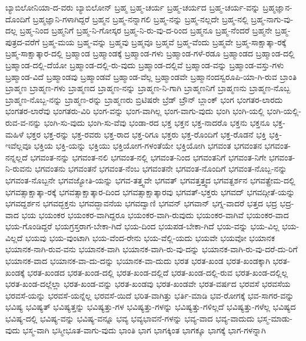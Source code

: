 {ಬ್ಯಾಬಿಲೋನಿಯಾ-ದ-ವರು
ಬ್ಯಾಬಿಲೋನ್
ಬ್ರಹ್ಮ
ಬ್ರಹ್ಮ-ಚರ್ಯ
ಬ್ರಹ್ಮ-ಚರ್ಯದ
ಬ್ರಹ್ಮ-ಚರ್ಯ-ವನ್ನು
ಬ್ರಹ್ಮಜ್ಞಾನ-ದೊಂದಿಗೆ
ಬ್ರಹ್ಮಜ್ಞಾನಿ-ಗಳಾಗಿದ್ದರೆ
ಬ್ರಹ್ಮನ
ಬ್ರಹ್ಮ-ನನ್ನಾಗಲಿ
ಬ್ರಹ್ಮ-ನನ್ನು
ಬ್ರಹ್ಮ-ನಲ್ಲದೇ
ಬ್ರಹ್ಮ-ನಲ್ಲಿ
ಬ್ರಹ್ಮ-ನಾಗು-ವು-ದಲ್ಲ
ಬ್ರಹ್ಮ-ನಿಂದ
ಬ್ರಹ್ಮನಿಗೆ
ಬ್ರಹ್ಮ-ನಿ-ಗೋಸ್ಕರ
ಬ್ರಹ್ಮ-ನಿ-ರು-ವು-ದ-ರಿಂದ
ಬ್ರಹ್ಮನೂ
ಬ್ರಹ್ಮ-ನೆಂದರೆ
ಬ್ರಹ್ಮನೇ
ಬ್ರಹ್ಮ-ಪುತ್ರದ-ವರೆಗೆ
ಬ್ರಹ್ಮ-ಮಯ
ಬ್ರಹ್ಮ-ವನ್ನು
ಬ್ರಹ್ಮವು
ಬ್ರಹ್ಮವೂ
ಬ್ರಹ್ಮವೆ
ಬ್ರಹ್ಮ-ವೆಂದು
ಬ್ರಹ್ಮವೇ
ಬ್ರಹ್ಮ-ಸಾಕ್ಷಾತ್ಕಾ-ರಕ್ಕೆ
ಬ್ರಹ್ಮ-ಸಾಕ್ಷಾತ್ಕಾರ-ದಲ್ಲಿ
ಬ್ರಹ್ಮಾಂಡ
ಬ್ರಹ್ಮಾಂಡಕ್ಕೆ
ಬ್ರಹ್ಮಾಂಡ-ಗಳು
ಬ್ರಹ್ಮಾಂಡ-ಗಳೆ-ರಡೂ
ಬ್ರಹ್ಮಾಂಡದ
ಬ್ರಹ್ಮಾಂಡ-ದಲ್ಲಿ
ಬ್ರಹ್ಮಾಂಡ-ದಲ್ಲಿ-ದೆಯೋ
ಬ್ರಹ್ಮಾಂಡ-ದಲ್ಲಿ-ರು-ವುದು
ಬ್ರಹ್ಮಾಂಡ-ದಲ್ಲಿವೆ
ಬ್ರಹ್ಮಾಂಡ-ವನ್ನು
ಬ್ರಹ್ಮಾಂಡ-ವಸ್ತು-ಗಳು
ಬ್ರಹ್ಮಾಂಡ-ವಿದೆ
ಬ್ರಹ್ಮಾಂಡವು
ಬ್ರಹ್ಮಾಂಡವೆ
ಬ್ರಹ್ಮಾಂಡ-ವೆಲ್ಲ
ಬ್ರಹ್ಮಾಂಡವೇ
ಬ್ರಹ್ಮಾನಂದಸ್ವರೂಪಿ-ಯಾ-ಗಿ-ರುವ
ಬ್ರಾಂತಿ
ಬ್ರಾಹ್ಮಣ
ಬ್ರಾಹ್ಮಣ-ಗಳು
ಬ್ರಾಹ್ಮಣದ
ಬ್ರಾಹ್ಮಣ-ನನ್ನು
ಬ್ರಾಹ್ಮಣ-ನಿ-ಗಾಗಿ
ಬ್ರಾಹ್ಮಣನಿಗೆ
ಬ್ರಾಹ್ಮಣನು
ಬ್ರಾಹ್ಮಣ-ನೊಬ್ಬ
ಬ್ರಾಹ್ಮಣ-ನೊಬ್ಬ-ನನ್ನು
ಬ್ರಾಹ್ಮಣ-ರನ್ನು
ಬ್ರಾಹ್ಮಣರು
ಬ್ರಿಟಿಷರೇ
ಬ್ರೆಡ್
ಬ್ರೌನ್
ಬ್ಲಾಂಕ್
ಭಂಗ
ಭಂಗತರ-ಲಾರದು
ಭಂಗತರ-ಲಾರೆವು
ಭಂಗತರು-ವಿರಿ
ಭಂಗ-ವನ್ನು
ಭಂಗ-ವಾಗಿಲ್ಲ
ಭಂಗ-ವಾಗು-ವುದು
ಭಂಗಿ
ಭಂಗಿ-ಯಲ್ಲಿ
ಭಂಗಿ-ಯಲ್ಲಿ-ರುವ-ವ-ನನ್ನು
ಭಂಗಿ-ಸು-ವುದು
ಭಂಗಿ-ಸು-ವೆವು
ಭಂಡಾ-ರದ
ಭಕ್ತ
ಭಕ್ತನ
ಭಕ್ತ-ನಾದರೊ
ಭಕ್ತನು
ಭಕ್ತನೂ
ಭಕ್ತ-ಮಹಿಳೆ
ಭಕ್ತರ
ಭಕ್ತ-ರನ್ನು
ಭಕ್ತ-ರವರು
ಭಕ್ತ-ರಾದ
ಭಕ್ತ-ರಿಗೂ
ಭಕ್ತರು
ಭಕ್ತ-ರೊಂದಿಗೆ
ಭಕ್ತ-ರೊಡನೆ
ಭಕ್ತಿ
ಭಕ್ತಿ-ಇವೆಲ್ಲವೂ
ಭಕ್ತಿಯ
ಭಕ್ತಿ-ಯನ್ನು
ಭಕ್ತಿಯು
ಭಕ್ತಿಯೋಗ-ಗಳಂತೆಯೇ
ಭಕ್ತಿಯೋಗಿ
ಭಗವಂತ
ಭಗವಂತನ
ಭಗವಂತ-ನನ್ನಲ್ಲದೆ
ಭಗವಂತ-ನನ್ನು
ಭಗವಂತ-ನಲಿ
ಭಗವಂತ-ನಲ್ಲಿ
ಭಗವಂತ-ನಿಂದ
ಭಗವಂತನಿಗೆ
ಭಗವಂತ-ನಿಗೇ
ಭಗವಂತ-ನಿ-ರುವನು
ಭಗವಂತನು
ಭಗವಂತನೆ
ಭಗವಂತ-ನೆಂಬ
ಭಗವಂತನೇ
ಭಗವಂತ-ನೊಂದಿಗೆ
ಭಗವಂತ-ನೊಬ್ಬ-ನನ್ನು
ಭಗವಂತ-ನೊಬ್ಬನೇ
ಭಗವಜ್ಯೋತಿ-ಯನ್ನು
ಭಗವ-ತತ್ತ್ವವೇ
ಭಗವತ್
ಭಗವತ್ತತ್ತ್ವದ
ಭಗವತ್ದರ್ಶನ
ಭಗವತ್ಪ್ರೇಮ-ದಲ್ಲಿ
ಭಗವತ್ಸಾಕ್ಷಾತ್ಕಾ-ರಕ್ಕೆ
ಭಗವತ್ಸಾಕ್ಷಾತ್ಕಾರ-ದಿಂದ
ಭಗವತ್ಸಾಕ್ಷಾತ್ಕಾರವು
ಭಗವತ್-ಭಕ್ತರು
ಭಗವದ್
ಭಗವದ್ಗೀತೆ-ಯನ್ನು
ಭಗವದ್ದರ್ಶನ
ಭಗವದ್ಭಕ್ತನು
ಭಗವದ್ಭಾವನೆಯ
ಭಗವದ್ವಾಣಿ
ಭಗವನ್
ಭಗವಾನ್
ಭಗ್ನ-ವಾದರೆ
ಭತ್ತದ
ಭದ್ರ
ಭದ್ರ-ವಾದ
ಭಯ
ಭಯಂಕರ
ಭಯಂಕರ-ವಾಗಿದ್ದರೂ
ಭಯಂಕರ-ವಾಗಿ-ರುವುದು
ಭಯಂಕರ-ವಾಗಿವೆ
ಭಯಂಕರ-ವಾದ
ಭಯ-ಗೊಂಡಿದ್ದರೆ
ಭಯಗ್ರಸ್ತರಾಗ-ಬೇಕಾ-ಗಿದೆ
ಭಯ-ದಿಂದ
ಭಯಪಡ-ಬೇಕಾ-ಗಿದೆ
ಭಯ-ವನ್ನು
ಭಯ-ವಿಲ್ಲ
ಭಯ-ವಿಲ್ಲದೆ
ಭಯವು
ಭಯ-ವುಂಟಾಗಿ
ಭಯ-ವೆಂದ-ರೇನು
ಭಯ-ವೆಲ್ಲಿ-ಯದು
ಭಯವೇ
ಭಯವೋ
ಭಯಾನಕ
ಭಯಾನಕ-ನಾಗಿ-ರುವ-ವನು
ಭಯಾನಕ-ವಾಗಿ
ಭಯಾನಕ-ವಾಗಿ-ರು-ವು-ದನ್ನು
ಭಯಾನಕ-ವಾಗಿ-ರು-ವು-ದರೆ-ದು-ರಿಗೆ
ಭಯಾನಕ-ವಾದ
ಭಯಾನಕ-ವಾ-ದು-ದನ್ನು
ಭಯಾನಕ-ವಾ-ದುದು
ಭರತ
ಭರತ-ಖಂಡ
ಭರತ-ಖಂಡಕ್ಕಾಗಿ
ಭರತ-ಖಂಡಕ್ಕೆ
ಭರತ-ಖಂಡದ
ಭರತ-ಖಂಡ-ದಲ್ಲಿ
ಭರತ-ಖಂಡ-ದಲ್ಲಿದೆ
ಭರತ-ಖಂಡ-ದಲ್ಲಿ-ರುವ
ಭರತ-ಖಂಡ-ದಲ್ಲಿಲ್ಲ
ಭರತ-ಖಂಡ-ದಲ್ಲೆಲ್ಲಾ
ಭರತ-ಖಂಡ-ವನ್ನು
ಭರತ-ಖಂಡವು
ಭರತ-ಖಂಡವೇ
ಭರತ-ವರ್ಷದ
ಭರವಸೆ
ಭರವಸೆಯ
ಭರವಸೆ-ಯನ್ನು
ಭರವಸೆ-ಯನ್ನೆಲ್ಲ
ಭರವಸೆ-ಯಿದೆ
ಭರಿತ-ವಾಗಿತ್ತು
ಭರ್ತಿ-ಮಾಡಿ
ಭವ-ರೋಗಕ್ಕೆ
ಭವ-ಸಾಗರ-ವನ್ನು
ಭವಿಷ್ಯ
ಭವಿಷ್ಯತ್
ಭವಿಷ್ಯತ್ತನ್ನು
ಭವಿಷ್ಯತ್ತು-ಗಳ
ಭವಿಷ್ಯತ್ತು-ಗಳನ್ನು
ಭವಿಷ್ಯತ್ತು-ಗಳಿಲ್ಲದೆ
ಭವಿಷ್ಯತ್ತು-ಗಳೆಲ್ಲ
ಭವಿಷ್ಯದ
ಭವಿಷ್ಯ-ದಲ್ಲಿ
ಭವಿಷ್ಯ-ವನ್ನು
ಭವಿಷ್ಯ-ವನ್ನೂ
ಭವ್ಯ
ಭವ್ಯಭಾವನೆ-ಗಳನ್ನು
ಭವ್ಯ-ವಾದ
ಭವ್ಯ-ವಾದುದು
ಭಸ್ಮ-ಮಾಡು-ವುದು
ಭಸ್ಮ-ವಾಗಿ
ಭಸ್ಮೀಭೂತ-ವಾಗು-ವುದು
ಭಾಂತಿ
ಭಾಗ
ಭಾಗಕ್ಕಿಂತ
ಭಾಗಕ್ಕೂ
ಭಾಗಕ್ಕೆ
ಭಾಗ-ಗಳನ್ನಾಗಿ
}
